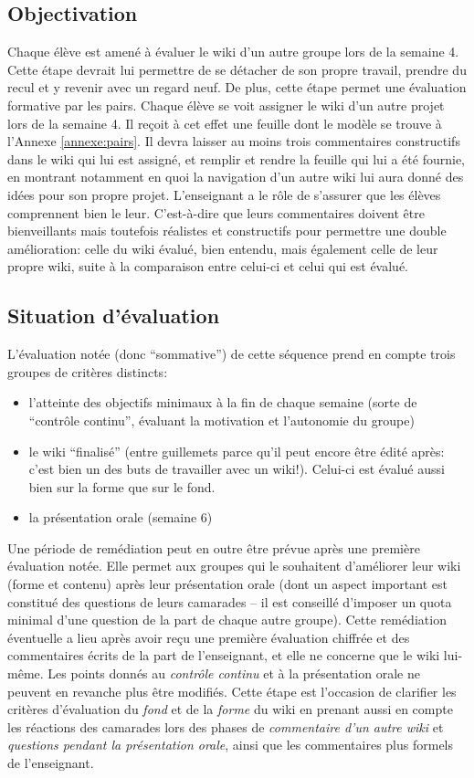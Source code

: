 \documentclass[11pt,bibliography=totoc]{scrartcl}
\newcommand\ajout[1]{{\color{blue} #1}}
\newcommand\rajout[1]{{\color{green} #1}}
\begin{document}
\subsection{Objectivation}
Chaque élève est amené à évaluer le wiki d'un autre groupe lors de la semaine
4. Cette étape devrait lui permettre de se détacher de son propre travail,
prendre du recul et y revenir avec un regard neuf. De plus, cette étape permet
une évaluation formative par les pairs. Chaque élève se voit assigner le wiki
d'un autre projet lors de la semaine 4. Il reçoit à cet effet une feuille dont
le modèle se trouve à l'Annexe \ref{annexe:pairs}. Il devra laisser au moins
trois commentaires constructifs dans le wiki qui lui est assigné, et remplir et
rendre la feuille qui lui a été fournie, en montrant notamment en quoi la
navigation d'un autre wiki lui aura donné des idées pour son propre projet.
\ajout {L'enseignant a le rôle de s'assurer que les élèves comprennent bien le
  leur. C'est-à-dire que leurs commentaires doivent être bienveillants mais
  toutefois réalistes et constructifs pour permettre une double amélioration:
  celle du wiki évalué, bien entendu, mais également celle de leur propre wiki,
  suite à la comparaison entre celui-ci et celui qui est évalué.}

\subsection{Situation d'évaluation}
L'évaluation notée (donc ``sommative'') de cette séquence prend en compte trois
groupes de critères distincts:
\begin{itemize}
\item l'atteinte des objectifs minimaux à la fin de chaque semaine (sorte de
  ``contrôle continu'', évaluant la motivation et l'autonomie du groupe)
\item le wiki ``finalisé'' (entre guillemets parce qu'il peut encore être édité
  après: c'est bien un des buts de travailler avec un wiki!). \rajout{Celui-ci
    est évalué aussi bien sur la forme que sur le fond.}
\item la présentation orale (semaine 6)
\end{itemize}
\rajout{Une période de remédiation peut en outre être prévue après une première
  évaluation notée. Elle permet aux groupes qui le souhaitent d'améliorer leur
  wiki (forme et contenu) après leur présentation orale (dont un aspect
  important est constitué des questions de leurs camarades -- il est conseillé
  d'imposer un quota minimal d'une question de la part de chaque autre
  groupe). Cette remédiation éventuelle a lieu après avoir reçu une première
  évaluation chiffrée et des commentaires écrits de la part de l'enseignant, et
  elle ne concerne que le wiki lui-même. Les points donnés au \textit{contrôle
    continu} et à la présentation orale ne peuvent en revanche plus être
  modifiés. Cette étape est l'occasion de clarifier les critères d'évaluation du
  \textit{fond} et de la \textit{forme} du wiki en prenant aussi en compte les
  réactions des camarades lors des phases de \textit{commentaire d'un autre
    wiki} et \textit{questions pendant la présentation orale}, ainsi que les
  commentaires plus formels de l'enseignant.}
\end{document}
